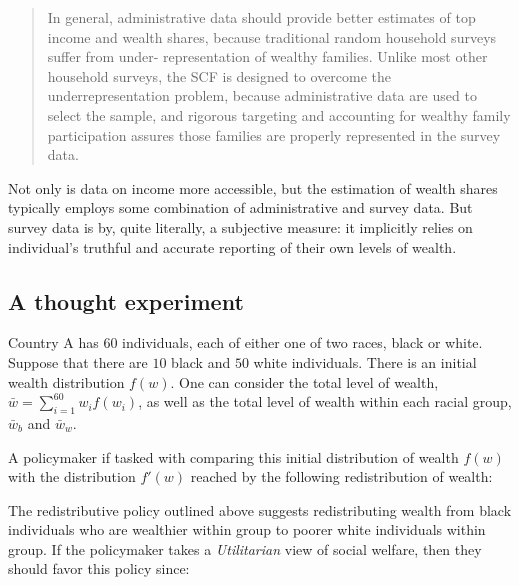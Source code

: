 \documentclass[\econtexRoot/IneqMeas]{subfiles}
\begin{document}
\begin{quote}

In general, administrative data should provide better estimates of top income and wealth shares, because traditional random household surveys suffer from under- representation of wealthy families. Unlike most other household surveys, the SCF is designed to overcome the underrepresentation problem, because administrative data are used to select the sample, and rigorous targeting and accounting for wealthy family participation assures those families are properly represented in the survey data.

\end{quote}

\par Not only is  data on income more accessible, but the estimation of wealth shares typically employs some combination of administrative and survey data. But survey data is by, quite literally, a subjective measure: it implicitly relies on individual's truthful and accurate reporting of their own levels of wealth.

\subsection{A thought experiment}

\par Country A has $60$ individuals, each of either one of two races, black or white. Suppose that
there are $10$ black and $50$ white individuals. There is an initial wealth distribution $f(w)$. One
can consider the total level of wealth, $\bar{w} = \sum_{i=1}^{60} w_i f(w_i)$, as well as
the total level of wealth within each racial group, $\bar{w}_b$ and $\bar{w}_w$.

\par A policymaker if tasked with comparing this initial distribution of wealth $f(w)$ with the
distribution $f'(w)$ reached by the following redistribution of wealth:

\begin{quote}


\end{quote}

\par The redistributive policy outlined above suggests redistributing wealth from black individuals who are wealthier within group to poorer white individuals within group. If the policymaker takes a \textit{Utilitarian} view of social welfare, then they should favor this policy since:
\end{document}
